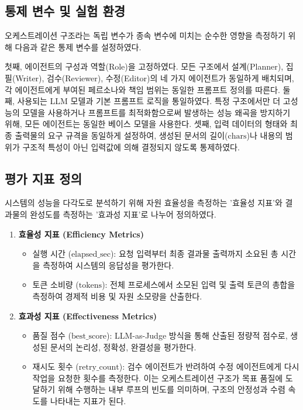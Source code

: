 \documentclass[10pt,twocolumn]{article}
\begin{document}
\subsection{통제 변수 및 실험 환경}
오케스트레이션 구조라는 독립 변수가 종속 변수에 미치는 순수한 영향을 측정하기 위해 다음과 같은 통제 변수를 설정하였다.

첫째, 에이전트의 구성과 역할(Role)을 고정하였다. 모든 구조에서 설계(Planner), 집필(Writer), 검수(Reviewer), 수정(Editor)의 네 가지 에이전트가 동일하게 배치되며, 각 에이전트에게 부여된 페르소나와 책임 범위는 동일한 프롬프트 정의를 따른다. 둘째, 사용되는 LLM 모델과 기본 프롬프트 로직을 통일하였다. 특정 구조에서만 더 고성능의 모델을 사용하거나 프롬프트를 최적화함으로써 발생하는 성능 왜곡을 방지하기 위해, 모든 에이전트는 동일한 베이스 모델을 사용한다. 셋째, 입력 데이터의 형태와 최종 출력물의 요구 규격을 동일하게 설정하여, 생성된 문서의 길이($\text{chars}$)나 내용의 범위가 구조적 특성이 아닌 입력값에 의해 결정되지 않도록 통제하였다.

\subsection{평가 지표 정의}
시스템의 성능을 다각도로 분석하기 위해 자원 효율성을 측정하는 '효율성 지표'와 결과물의 완성도를 측정하는 '효과성 지표'로 나누어 정의하였다.

\begin{enumerate}
    \item \textbf{효율성 지표 (Efficiency Metrics)}
    \begin{itemize}
        \item 실행 시간 ($\text{elapsed\_sec}$): 요청 입력부터 최종 결과물 출력까지 소요된 총 시간을 측정하여 시스템의 응답성을 평가한다.
        \item 토큰 소비량 ($\text{tokens}$): 전체 프로세스에서 소모된 입력 및 출력 토큰의 총합을 측정하여 경제적 비용 및 자원 소모량을 산출한다.
    \end{itemize}
    \item \textbf{효과성 지표 (Effectiveness Metrics)}
    \begin{itemize}
        \item 품질 점수 ($\text{best\_score}$): LLM-as-Judge 방식을 통해 산출된 정량적 점수로, 생성된 문서의 논리성, 정확성, 완결성을 평가한다.
        \item 재시도 횟수 ($\text{retry\_count}$): 검수 에이전트가 반려하여 수정 에이전트에게 다시 작업을 요청한 횟수를 측정한다. 이는 오케스트레이션 구조가 목표 품질에 도달하기 위해 수행하는 내부 루프의 빈도를 의미하며, 구조의 안정성과 수렴 속도를 나타내는 지표가 된다.
    \end{itemize}
\end{enumerate}
\end{document}
